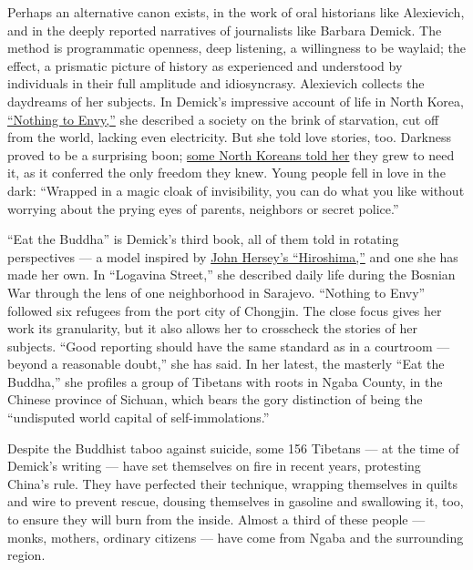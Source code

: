 Perhaps an alternative canon exists, in the work of oral historians like
Alexievich, and in the deeply reported narratives of journalists like
Barbara Demick. The method is programmatic openness, deep listening, a
willingness to be waylaid; the effect, a prismatic picture of history as
experienced and understood by individuals in their full amplitude and
idiosyncrasy. Alexievich collects the daydreams of her subjects. In
Demick's impressive account of life in North Korea,
\href{https://www.nytimes3xbfgragh.onion/2010/01/27/books/27book.html}{``Nothing
to Envy,''} she described a society on the brink of starvation, cut off
from the world, lacking even electricity. But she told love stories,
too. Darkness proved to be a surprising boon;
\href{https://www.nytimes3xbfgragh.onion/2010/01/27/books/excerpt-nothing-to-envy.html}{some
North Koreans told her} they grew to need it, as it conferred the only
freedom they knew. Young people fell in love in the dark: ``Wrapped in a
magic cloak of invisibility, you can do what you like without worrying
about the prying eyes of parents, neighbors or secret police.''

``Eat the Buddha'' is Demick's third book, all of them told in rotating
perspectives --- a model inspired by
\href{https://www.nytimes3xbfgragh.onion/1985/08/04/books/beyond-the-brink-of-destruction.html}{John
Hersey's ``Hiroshima,''} and one she has made her own. In ``Logavina
Street,'' she described daily life during the Bosnian War through the
lens of one neighborhood in Sarajevo. ``Nothing to Envy'' followed six
refugees from the port city of Chongjin. The close focus gives her work
its granularity, but it also allows her to crosscheck the stories of her
subjects. ``Good reporting should have the same standard as in a
courtroom --- beyond a reasonable doubt,'' she has said. In her latest,
the masterly ``Eat the Buddha,'' she profiles a group of Tibetans with
roots in Ngaba County, in the Chinese province of Sichuan, which bears
the gory distinction of being the ``undisputed world capital of
self-immolations.''

Despite the Buddhist taboo against suicide, some 156 Tibetans --- at the
time of Demick's writing --- have set themselves on fire in recent
years, protesting China's rule. They have perfected their technique,
wrapping themselves in quilts and wire to prevent rescue, dousing
themselves in gasoline and swallowing it, too, to ensure they will burn
from the inside. Almost a third of these people --- monks, mothers,
ordinary citizens --- have come from Ngaba and the surrounding region.

